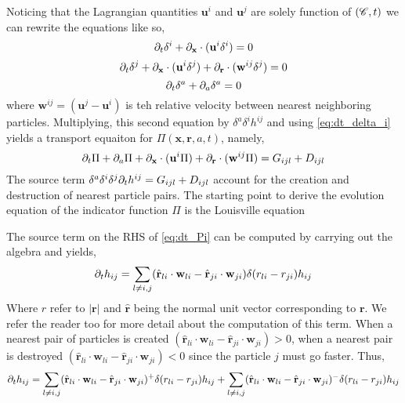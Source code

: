 Noticing that the Lagrangian quantities $\textbf{u}^i$ and $\textbf{u}^j$ are solely function of $(\mathscr{C},t)$ we can rewrite the equations like so, 
\begin{equation}
    \partial_t \delta^i
    + \partial_{\textbf{x}} \cdot (\textbf{u}^i \delta^i)
    = 0 
    \label{eq:dt_delta_i}
\end{equation}
\begin{equation}
    \partial_t \delta^j
    + \partial_{\textbf{x}} \cdot (\textbf{u}^i \delta^j)
    + \partial_{\textbf{r}}  \cdot (\textbf{w}^{ij}\delta^j)
    = 0 
\end{equation}
\begin{equation*}
    \partial_t \delta^a
    + 
    \partial_a \delta^a
    = 0 
\end{equation*}
where $\textbf{w}^{ij} = (\textbf{u}^j - \textbf{u}^i)$ is teh relative velocity between nearest neighboring particles. 
Multiplying, this second equation by $\delta^a\delta^ih^{ij}$ and using \ref{eq:dt_delta_i} yields a transport equaiton for $\Pi(\textbf{x},\textbf{r},a,t)$, namely,
\begin{equation}
    \partial_t \Pi
    + \partial_a \Pi
    + \partial_{\textbf{x}} \cdot (\textbf{u}^i \Pi)
    + \partial_{\textbf{r}}  \cdot (\textbf{w}^{ij} \Pi)
    = G_{ijl}+D_{ijl}
    \label{eq:dt_Pi}
\end{equation}
The source term $\delta^a\delta^i\delta^j \partial_t h^{ij} = G_{ijl}+D_{ijl}$ account for the creation and destruction of nearest particle pairs. 
The starting point to derive the evolution equation of the indicator function $\Pi$ is the Louisville equation

The source term on the RHS of \ref{eq:dt_Pi} can be computed by carrying out the algebra and yields, 
\begin{equation*}
    \partial_t h_{ij} 
    = 
    \sum_{l \neq i,j} 
    (\hat{\textbf{r}}_{li}\cdot \textbf{w}_{li}
    - 
    \hat{\textbf{r}}_{ji}\cdot\textbf{w}_{ji})
    \delta(r_{li} - r_{ji})
        h_{ij}
\end{equation*}
Where $r$ refer to $|\textbf{r}|$ and $\hat{\textbf{r}}$ being the normal unit vector corresponding to $\textbf{r}$. 
We refer the reader too \citet[Appendix A.]{zhang2023evolution} for more detail about the computation of this term.
When a nearest pair of particles is created $(\hat{\textbf{r}}_{li}\cdot \textbf{w}_{li} - \hat{\textbf{r}}_{ji}\cdot\textbf{w}_{ji}) > 0$, when a nearest pair is destroyed $(\hat{\textbf{r}}_{li}\cdot \textbf{w}_{li} - \hat{\textbf{r}}_{ji}\cdot\textbf{w}_{ji}) < 0$ since the particle $j$ must go faster. 
Thus,
\begin{equation*}
    \partial_t h_{ij} 
    = 
    \sum_{l \neq i,j} 
    (\hat{\textbf{r}}_{li}\cdot \textbf{w}_{li}
    - 
    \hat{\textbf{r}}_{ji}\cdot\textbf{w}_{ji})^+
    \delta(r_{li} - r_{ji})
        h_{ij}
    + \sum_{l \neq i,j} 
    (\hat{\textbf{r}}_{li}\cdot \textbf{w}_{li}
    - 
    \hat{\textbf{r}}_{ji}\cdot\textbf{w}_{ji})^-
    \delta(r_{li} - r_{ji})
        h_{ij}
\end{equation*}

